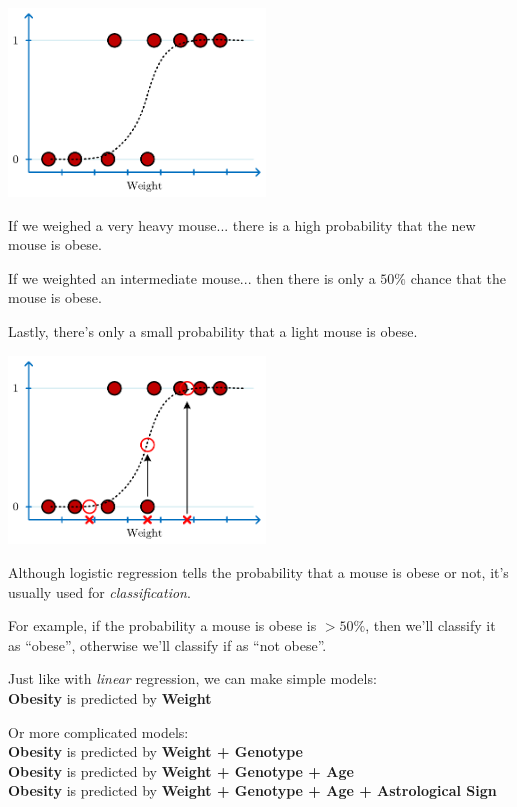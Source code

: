 \documentclass[
	final,
	a4paper,
	oneside,
	parskip=full,
	headings=standardclasses,
	headings=big,
	pointednumbers
]{scrartcl}
\newcommand{\tb}[1]{\textbf{#1}}
\newcommand{\ti}[1]{\textit{#1}}
\begin{document}
    \begin{center}
        \includegraphics[height=5cm]{StatQuest_Logistic_Regression_Logistic_Boolean.pdf}
    \end{center}

    If we weighed a very heavy mouse... there is a high probability that the new mouse is obese.

    If we weighted an intermediate mouse... then there is only a $50\%$ chance that the mouse is obese.

    Lastly, there's only a small probability that a light mouse is obese.

    \begin{center}
        \includegraphics[height=5cm]{StatQuest_Logistic_Regression_Logistic_Percentage.pdf}
    \end{center}

    Although logistic regression tells the probability that a mouse is obese or not,
    it's usually used for \ti{classification}.

    For example, if the probability a mouse is obese is $> 50\%$, then we'll classify
    it as ``obese'', otherwise we'll classify if as ``not obese''.

    Just like with \ti{linear} regression, we can make simple models:\\
    \tb{Obesity} is predicted by \tb{Weight}

    Or more complicated models: \\
    \tb{Obesity} is predicted by \tb{Weight + Genotype} \\
    \tb{Obesity} is predicted by \tb{Weight + Genotype + Age} \\
    \tb{Obesity} is predicted by \tb{Weight + Genotype + Age + Astrological Sign}
\end{document}
